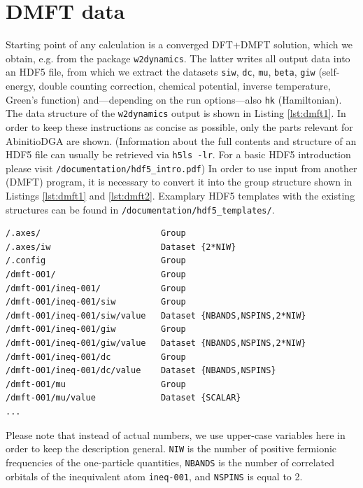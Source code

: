 \documentclass[a4paper,11pt]{article}
\numberwithin{equation}{section} %
\begin{document}
\section{DMFT data}
Starting point of any calculation is a converged DFT+DMFT solution, which we obtain, e.g. from the package
\verb|w2dynamics|. The latter writes all output data into an HDF5 file, from which we extract the datasets \verb|siw|, \verb|dc|, \verb|mu|,
\verb|beta|, \verb|giw| (self-energy, double counting correction, chemical potential, inverse temperature, Green's function)
and---depending on the run options---also \verb|hk| (Hamiltonian).
The data structure of the \verb|w2dynamics| output is shown in Listing \ref{lst:dmft1}.
In order to keep these instructions as concise as possible, only the parts relevant for AbinitioDGA are shown.
(Information about the full contents and structure of an HDF5 file can usually be retrieved via  \verb|h5ls -lr|. For a basic HDF5 introduction
please visit  {\color{blue}\verb+/documentation/hdf5_intro.pdf+}) In order to use
input from another (DMFT) program, it is necessary to convert it into the group structure
shown in Listings \ref{lst:dmft1} and \ref{lst:dmft2}.
Examplary HDF5 templates with the existing structures can be found in {\color{blue}\verb+/documentation/hdf5_templates/+}.
\newpage
\begin{lstlisting}[caption=HDF5-structure of the DMFT output, frame=single, basicstyle=\small, label={lst:dmft1}]
/.axes/                        Group
/.axes/iw                      Dataset {2*NIW}
/.config                       Group
/dmft-001/                     Group
/dmft-001/ineq-001/            Group
/dmft-001/ineq-001/siw         Group
/dmft-001/ineq-001/siw/value   Dataset {NBANDS,NSPINS,2*NIW}
/dmft-001/ineq-001/giw         Group
/dmft-001/ineq-001/giw/value   Dataset {NBANDS,NSPINS,2*NIW}
/dmft-001/ineq-001/dc          Group
/dmft-001/ineq-001/dc/value    Dataset {NBANDS,NSPINS}
/dmft-001/mu                   Group
/dmft-001/mu/value             Dataset {SCALAR}
...
\end{lstlisting}
Please note that instead of actual numbers, we use upper-case variables here in order to keep
the description general. \verb|NIW| is the number of positive fermionic frequencies of the one-particle quantities,
\verb|NBANDS| is the number of correlated orbitals of the inequivalent atom \verb|ineq-001|, and \verb|NSPINS| is equal to 2.
\end{document}
